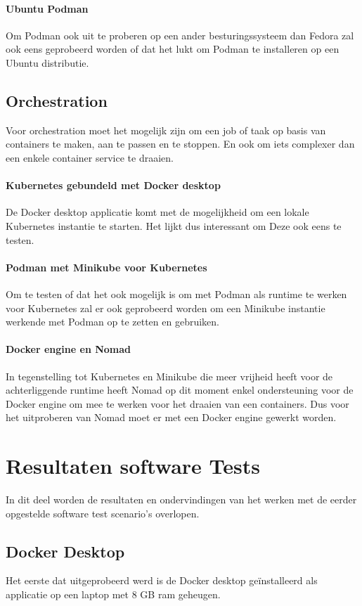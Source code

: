 \paragraph{Ubuntu Podman}
Om Podman ook uit te proberen op een ander besturingssysteem dan Fedora zal ook eens geprobeerd worden of dat het lukt om Podman te installeren op een Ubuntu distributie.

\subsection{Orchestration}
Voor orchestration moet het mogelijk zijn om een job of taak op basis van containers te maken, aan te passen en te stoppen. En ook om iets complexer dan een enkele container service te draaien.

\paragraph{Kubernetes gebundeld met Docker desktop}
De Docker desktop applicatie komt met de mogelijkheid om een lokale Kubernetes instantie te starten. Het lijkt dus interessant om Deze ook eens te testen.

\paragraph{Podman met Minikube voor Kubernetes}
Om te testen of dat het ook mogelijk is om met Podman als runtime te werken voor Kubernetes zal er ook geprobeerd worden om een Minikube instantie werkende met Podman op te zetten en gebruiken.

\paragraph{Docker engine en Nomad}
In tegenstelling tot Kubernetes en Minikube die meer vrijheid heeft voor de achterliggende runtime heeft Nomad op dit moment enkel ondersteuning voor de Docker engine om mee te werken voor het draaien van een containers. Dus voor het uitproberen van Nomad moet er met een Docker engine gewerkt worden.

\section{Resultaten software Tests}
In dit deel worden de resultaten en ondervindingen van het werken met de eerder opgestelde software test scenario’s overlopen. 

\subsection{Docker Desktop} \label{DockerDesktop}
Het eerste dat uitgeprobeerd werd is de Docker desktop geïnstalleerd als applicatie op een laptop met 8 GB ram geheugen.

